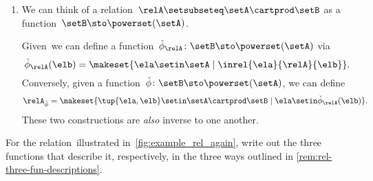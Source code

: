 \begin{enumerate}
    \item We can think of a relation~$\relA \setsubseteq \setA \cartprod \setB$ as a function~$\setB  \sto \powerset (\setA)$.

          Given~\relA we can define a function~$\check \phi_{\relA} \colon \setB \sto \powerset (\setA)$ via
          \begin{equation}
              \check \phi_{\relA} (\elb) = \makeset{ \ela \setin \setA \mid \inrel{\ela}{\relA}{\elb}}.
          \end{equation}
          Conversely, given a function~$\check \phi \colon \setB \sto \powerset (\setA)$, we can define
          \begin{equation}
              \relA_{\check \phi} = \makeset{ \tup{\ela, \elb} \setin \setA \cartprod \setB \mid \ela \setin \check \phi_{\relA}(\elb)}.
          \end{equation}
          These two constructions are \emph{also} inverse to one another.
\end{enumerate}

\begin{marginfigure}
    \centering
    \caption{}
    \label{fig:example_rel_again}
\end{marginfigure}
\vfill
\begin{gradedexercise}
    \label{ex:Rel3Functions}
    For the relation~\relA illustrated in~\cref{fig:example_rel_again}, write out the three functions that describe it, respectively, in the three ways outlined in \cref{rem:rel-three-fun-descriptions}.
\end{gradedexercise}

